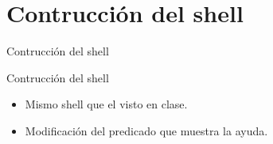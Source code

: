 \section{Contrucción del shell}
\begin{frame}
\end{frame}

\begin{frame}{Contrucción del shell}
 \begin{block}{Contrucción del shell}
  \begin{itemize}
   \item Mismo shell que el visto en clase.
   \item Modificación del predicado que muestra la ayuda.
  \end{itemize}
 \end{block}
\end{frame}
